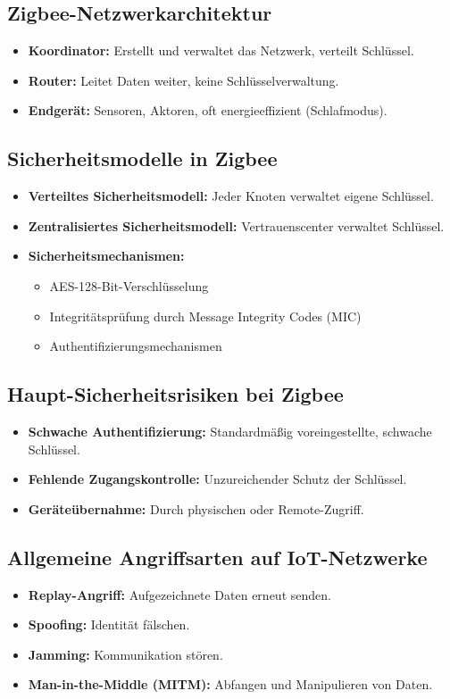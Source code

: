 \subsection{Zigbee-Netzwerkarchitektur}
\begin{itemize}
    \item \textbf{Koordinator:} Erstellt und verwaltet das Netzwerk, verteilt Schlüssel.
    \item \textbf{Router:} Leitet Daten weiter, keine Schlüsselverwaltung.
    \item \textbf{Endgerät:} Sensoren, Aktoren, oft energieeffizient (Schlafmodus).
\end{itemize}

\subsection{Sicherheitsmodelle in Zigbee}
\begin{itemize}
    \item \textbf{Verteiltes Sicherheitsmodell:} Jeder Knoten verwaltet eigene Schlüssel.
    \item \textbf{Zentralisiertes Sicherheitsmodell:} Vertrauenscenter verwaltet Schlüssel.
    \item \textbf{Sicherheitsmechanismen:}
    \begin{itemize}
        \item AES-128-Bit-Verschlüsselung
        \item Integritätsprüfung durch Message Integrity Codes (MIC)
        \item Authentifizierungsmechanismen
    \end{itemize}
\end{itemize}

\subsection{Haupt-Sicherheitsrisiken bei Zigbee}
\begin{itemize}
    \item \textbf{Schwache Authentifizierung:} Standardmäßig voreingestellte, schwache Schlüssel.
    \item \textbf{Fehlende Zugangskontrolle:} Unzureichender Schutz der Schlüssel.
    \item \textbf{Geräteübernahme:} Durch physischen oder Remote-Zugriff.
\end{itemize}

\subsection{Allgemeine Angriffsarten auf IoT-Netzwerke}
\begin{itemize}
    \item \textbf{Replay-Angriff:} Aufgezeichnete Daten erneut senden.
    \item \textbf{Spoofing:} Identität fälschen.
    \item \textbf{Jamming:} Kommunikation stören.
    \item \textbf{Man-in-the-Middle (MITM):} Abfangen und Manipulieren von Daten.
\end{itemize}

